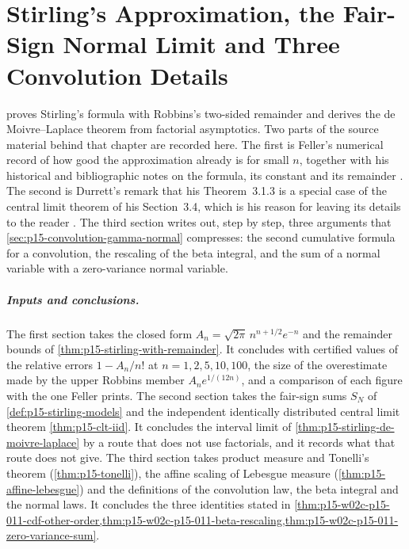 \chapter{Stirling's Approximation, the Fair-Sign Normal Limit and Three Convolution Details}
\label{sec:p15-w02c-p15-011-stirling-record}

 proves Stirling's formula with
Robbins's two-sided remainder and derives the de Moivre--Laplace theorem from
factorial asymptotics. Two parts of the source material behind that chapter
are recorded here. The first is Feller's numerical record of how good the
approximation already is for small \(n\), together with his historical and
bibliographic notes on the formula, its constant and its remainder
\cite[II.9, pp.~52--54]{Feller1968ProbabilityI}. The second is Durrett's
remark that his Theorem~3.1.3 is a special case of the central limit theorem
of his Section~3.4, which is his reason for leaving its details to the reader
\cite[pp.~113, 115]{DurrettPTEAuthor2019}. The third section writes out,
step by step, three arguments that
\cref{sec:p15-convolution-gamma-normal} compresses: the second cumulative
formula for a convolution, the rescaling of the beta integral, and the sum of
a normal variable with a zero-variance normal variable.

\paragraph{Inputs and conclusions.}
The first section takes the closed form
\(A_n=\sqrt{2\pi}\,n^{n+1/2}e^{-n}\) and the remainder bounds of
\cref{thm:p15-stirling-with-remainder}. It concludes with certified values of
the relative errors \(1-A_n/n!\) at \(n=1,2,5,10,100\), the size of the
overestimate made by the upper Robbins member \(A_ne^{1/(12n)}\), and a
comparison of each figure with the one Feller prints. The second section takes
the fair-sign sums \(S_N\) of \cref{def:p15-stirling-models} and the
independent identically distributed central limit theorem
\cref{thm:p15-clt-iid}. It concludes the interval limit of
\cref{thm:p15-stirling-de-moivre-laplace} by a route that does not use
factorials, and it records what that route does not give. The third section
takes product measure and Tonelli's theorem (\cref{thm:p15-tonelli}), the
affine scaling of Lebesgue measure (\cref{thm:p15-affine-lebesgue}) and the
definitions of the convolution law, the beta integral and the normal laws. It
concludes the three identities stated in
\cref{thm:p15-w02c-p15-011-cdf-other-order,thm:p15-w02c-p15-011-beta-rescaling,thm:p15-w02c-p15-011-zero-variance-sum}.

